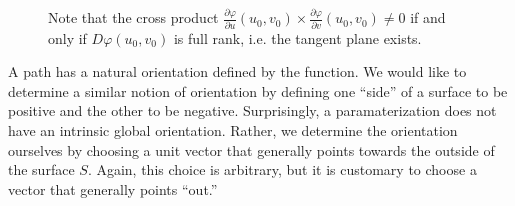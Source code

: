 \begin{example}
\begin{figure}[H]
			\caption{Note that the cross product $\frac{\partial \varphi}{\partial u} (u_0, v_0) \times \frac{\partial \varphi}{\partial v} (u_0, v_0) \neq 0$ if and only if $D\varphi (u_0, v_0)$ is full rank, i.e. the tangent plane exists.} 
			\label{fig:Cross_Product_Regular_Surfaces}
		\end{figure}
	\end{example}			
			
	A path has a natural orientation defined by the function. We would like to determine a similar notion of orientation by defining one ``side'' of a surface to be positive and the other to be negative. Surprisingly, a paramaterization does not have an intrinsic global orientation. Rather, we determine the orientation ourselves by choosing a unit vector that generally points towards the outside of the surface $S$. Again, this choice is arbitrary, but it is customary to choose a vector that generally points ``out.'' 

